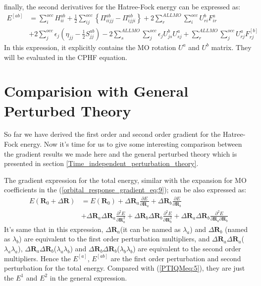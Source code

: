finally, the second derivatives for the Hatree-Fock energy can be expressed as: 
\begin{equation}
  \label{SOD_energy_hf_derivatives_eq:9}
\begin{split}
 E^{[ab]} &= \sum_{i}^{occ}H_{ii}^{ab} + \frac{1}{2}
    \sum_{ij}^{occ}
    \left \{ \Pi_{iijj}^{ab} - \Pi_{ijji}^{ab}
    \right \} + 2\sum_{r}^{ALL MO}\sum_{i}^{occ}U^{b}_{ri}F^{a}_{ir}  \\
& +  2\sum_{j}^{occ} \epsilon_{j}\left(\eta_{jj} - \frac{1}{2}S^{ab}_{jj}
\right)  -  2\sum_{s}^{ALL MO}\sum_{j}^{occ}
\epsilon_{j}U^{b}_{js}U^{a}_{sj} + \sum_{r}^{ALL MO}\sum_{j}^{occ}U^{a}_{rj} 
F_{rj}^{[b]}
\end{split}
\end{equation}
In this expression, it explicitly contains the MO rotation $U^{a}$ and $U^{b}$
matrix. They will be evaluated in the CPHF equation.

\section{Comparision with General Perturbed Theory}
%
%
%
So far we have derived the first order and second order gradient for the
Hatree-Fock energy. Now it's time for us to give some interesting comparison
between the gradient results we made here and the general perturbed theory
which is presented in section \ref{Time_independent_perturbation_theory}.

The gradient expression for the total energy, similar with the expansion for
MO coefficients in the (\ref{orbital_response_gradient_eq:9}); can be also
expressed as:
\begin{align}
\label{comparision_hf_derivatives_eq:1}
E(\bm{R}_{0} + \Delta \bm{R}) &=  E(\bm{R}_{0}) + \Delta
\bm{R}_{a}\frac{\partial E}{\partial \bm{R}_{a}} + \Delta
\bm{R}_{b}\frac{\partial E}{\partial \bm{R}_{b}} \nonumber \\
& + \Delta\bm{R}_{a}\Delta\bm{R}_{a}\frac{\partial^{2} E}{\partial
\bm{R}_{a}^{2}} +  \Delta\bm{R}_{b}\Delta\bm{R}_{b}\frac{\partial^{2}
E}{\partial \bm{R}_{b}^{2}} +
\Delta\bm{R}_{a}\Delta\bm{R}_{b}\frac{\partial^{2} E }{\partial\bm{R}_{a}
\partial\bm{R}_{b}}
\end{align}
It's same that in this expression, $\Delta\bm{R}_{a}$(it can be named as
$\lambda_{a}$) and $\Delta\bm{R}_{b}$ (named as $\lambda_{b}$) are equivalent to
the first order perturbation multipliers, and
$\Delta\bm{R}_{a}\Delta\bm{R}_{a}$($\lambda_{a}\lambda_{a}$),
$\Delta\bm{R}_{a}\Delta\bm{R}_{b}$($\lambda_{a}\lambda_{b}$) and
$\Delta\bm{R}_{b}\Delta\bm{R}_{b}$($\lambda_{b}\lambda_{b}$) are equivalent to
the second order multipliers. Hence the $E^{[a]}$, $E^{[ab]}$ are the first
order perturbation and second perturbation for the total energy. Compared with
(\ref{PTIQMeq:5}), they are just the $E^{1}$ and $E^{2}$ in the general
expression.

